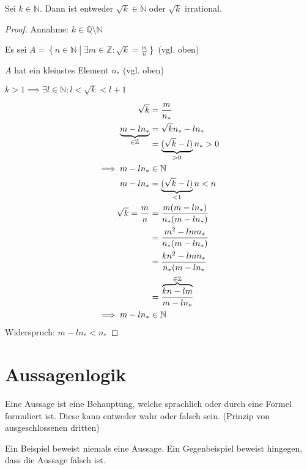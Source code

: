 \begin{theorem}
  Sei $k \in \mathbb{N}$. Dann ist entweder $\sqrt{k} \in \mathbb{N}$ oder $\sqrt{k}$ irrational.
\end{theorem}
\begin{proof}
  Annahme: $k \in \mathbb{Q} \setminus \mathbb{N}$

  Es sei \( A = \left\{ n \in \mathbb{N} \middle| \exists m \in \mathbb{Z}: \sqrt{k} = \frac{m}{n} \right\} \) (vgl. oben)

  $A$ hat ein kleinstes Element $n_{*}$ (vgl. oben)

  $k > 1 \implies \exists l \in \mathbb{N}: l < \sqrt{k} < l+1$

  \begin{align*}
    \sqrt{k} &= \frac{m}{n_{*}} \\
    \smash{\underbrace{m - ln_{*}}_{\in \mathbb{Z}}} &= \sqrt{k} n_{*} - ln_{*} \\
    \, &= \underbrace{(\sqrt{k} - l)}_{> 0} n_{*} > 0 \\
    \implies m - ln_{*} &\in \mathbb{N} \\
    m-ln_{*} &= \underbrace{(\sqrt{k} - l)}_{< 1} n < n \\
    \sqrt{k} = \frac{m}{n} &= \frac{m(m-ln_{*})}{n_{*}(m-ln_{*})} \\
    \, &= \frac{m^2 - lmn_*}{n_{*}(m-ln_{*})} \\
    \, &= \frac{kn^2 - lmn_{*}}{n_{*}(m-ln_{*}} \\
    \, &= \frac{\overbrace{kn - lm}^{\in \mathbb{Z}}}{m-ln_{*}} \\
    \implies m-ln_{*} &\in \mathbb{N}
  \end{align*}
  Widerspruch: $m-ln_{*} < n_{*}$
\end{proof}

\section{Aussagenlogik}

\begin{definition}
  Eine Aussage ist eine Behauptung, welche sprachlich oder durch eine Formel formuliert ist. Diese kann entweder wahr oder falsch sein. (Prinzip von ausgeschlossenen dritten)
\end{definition}
\begin{remark}
  Ein Beispiel beweist niemals eine Aussage. Ein Gegenbeispiel beweist hingegen, dass die Aussage falsch ist.
\end{remark}

